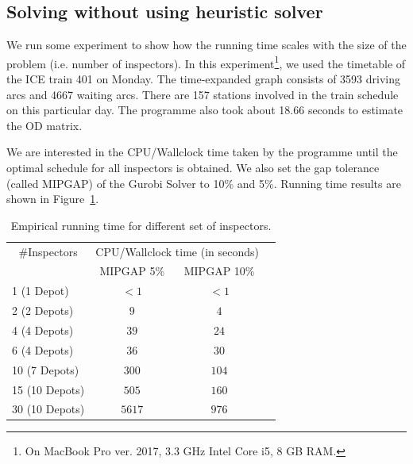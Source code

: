 \documentclass[11pt]{article}
\begin{document}
\subsection{Solving without using heuristic solver}

\par We run some experiment to show how the 
running time scales with the 
size of the problem (i.e. number of inspectors). In this 
experiment\footnote{On MacBook Pro ver. 2017, 3.3 GHz Intel Core i5, 8 GB RAM.}, we used the 
timetable of the ICE train 401 on Monday. The time-expanded graph consists of 3593
driving arcs and 4667 waiting arcs. There are 157 stations involved in the train schedule on
this particular day. The programme also took about 18.66 seconds to  estimate the OD matrix.

We are interested in the CPU/Wallclock time taken by the programme until the optimal schedule for all inspectors is obtained. We also set the gap tolerance (called MIPGAP) of the Gurobi Solver to 10\% and 5\%.
Running time results are shown in Figure~\ref{tab:runtime-without-heuristic}. 

\begin{table}[]
\centering
\begin{tabular}{|c|c|c|c|c|}
\hline
\multicolumn{2}{|c|}{\#Inspectors} & \multicolumn{2}{l|}{CPU/Wallclock time (in seconds)} \\ \cline{3-4} 
 \multicolumn{2}{|c|}{}  & MIPGAP 5\%           & MIPGAP 10\%           \\ \hline
\multicolumn{2}{|l|}{1 (1 Depot)} & $< 1$                & $< 1$                   \\ \hline
\multicolumn{2}{|l|}{2 (2 Depots)}  & $9$                 &  $4$           \\ \hline
\multicolumn{2}{|l|}{4 (4 Depots)}  & $39$                 &  $24$           \\ \hline
\multicolumn{2}{|l|}{6 (4 Depots)}  & $36$                 &  $30$           \\ \hline
\multicolumn{2}{|l|}{10 (7 Depots)}  & $300$                 &  $104$           \\ \hline
\multicolumn{2}{|l|}{15 (10 Depots)}  & $505$                 &  $160$           \\ \hline
\multicolumn{2}{|l|}{30 (10 Depots)}  & $5617$                 &  $976$           \\ \hline
\end{tabular}
\caption{Empirical running time for different set of inspectors.}
\label{tab:runtime-without-heuristic}
\end{table}
\end{document}
